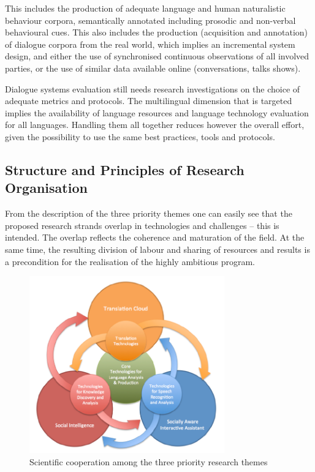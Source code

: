 \documentclass[10pt, plain]{../../metanetpaper}
\begin{document}
\begin{multicols}{2}
This includes the production of adequate language and human naturalistic behaviour corpora, semantically annotated including prosodic and non-verbal behavioural cues. This also includes the production (acquisition and annotation) of dialogue corpora from the real world, which implies an incremental system design, and either the use of synchronised continuous observations of all involved parties, or the use of similar data available online (conversations, talks shows).
 
Dialogue systems evaluation still needs research investigations on the choice of adequate metrics and protocols. The multilingual dimension that is targeted implies the availability of language resources and language technology evaluation for all languages. Handling them all together reduces however the overall effort, given the possibility to use the same best practices, tools and protocols.

\subsection{Structure and Principles of Research Organisation}
\label{sec:struct-princ-research-org}

From the description of the three priority themes one can easily see that the proposed research strands overlap in technologies and challenges -- this is intended. The overlap reflects the coherence and maturation of the field. At the same time, the resulting division of labour and sharing of resources and results is a precondition for the realisation of the highly ambitious program.

\begin{figure}[htb]
  \center
  \includegraphics[width=0.75\textwidth]{../_media/PT-Rings}
  \caption{Scientific cooperation among the three priority research themes}
  \label{fig:priority-themes}
\end{figure}
 

\end{multicols}
\end{document}
